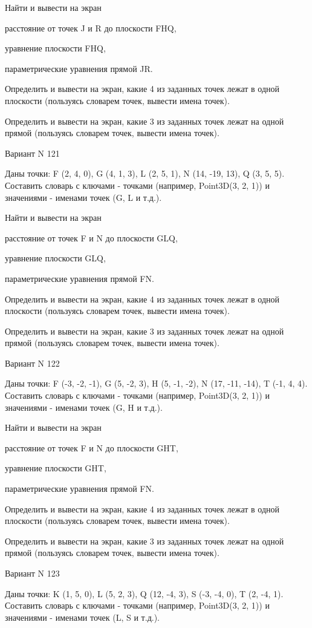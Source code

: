 \documentclass[11pt]{report}
\begin{document}
 
Найти и вывести на экран


расстояние от точек J и R до плоскости FHQ,

 
уравнение плоскости FHQ,

 
параметрические уравнения прямой JR.


Определить и вывести на экран, какие 4 из заданных точек лежат в одной плоскости (пользуясь словарем точек, вывести имена точек).


Определить и вывести на экран, какие 3 из заданных точек лежат на одной прямой (пользуясь словарем точек, вывести имена точек).

Вариант N 121

Даны точки: F (2, 4, 0), G (4, 1, 3), L (2, 5, 1), N (14, -19, 13), Q (3, 5, 5).
Составить словарь с ключами - точками (например, Point3D(3, 2, 1)) и значениями - именами точек (G, L и т.д.).

 
Найти и вывести на экран


расстояние от точек F и N до плоскости GLQ,

 
уравнение плоскости GLQ,

 
параметрические уравнения прямой FN.


Определить и вывести на экран, какие 4 из заданных точек лежат в одной плоскости (пользуясь словарем точек, вывести имена точек).


Определить и вывести на экран, какие 3 из заданных точек лежат на одной прямой (пользуясь словарем точек, вывести имена точек).

Вариант N 122

Даны точки: F (-3, -2, -1), G (5, -2, 3), H (5, -1, -2), N (17, -11, -14), T (-1, 4, 4).
Составить словарь с ключами - точками (например, Point3D(3, 2, 1)) и значениями - именами точек (G, H и т.д.).

 
Найти и вывести на экран


расстояние от точек F и N до плоскости GHT,

 
уравнение плоскости GHT,

 
параметрические уравнения прямой FN.


Определить и вывести на экран, какие 4 из заданных точек лежат в одной плоскости (пользуясь словарем точек, вывести имена точек).


Определить и вывести на экран, какие 3 из заданных точек лежат на одной прямой (пользуясь словарем точек, вывести имена точек).

Вариант N 123

Даны точки: K (1, 5, 0), L (5, 2, 3), Q (12, -4, 3), S (-3, -4, 0), T (2, -4, 1).
Составить словарь с ключами - точками (например, Point3D(3, 2, 1)) и значениями - именами точек (L, S и т.д.).
\end{document}

